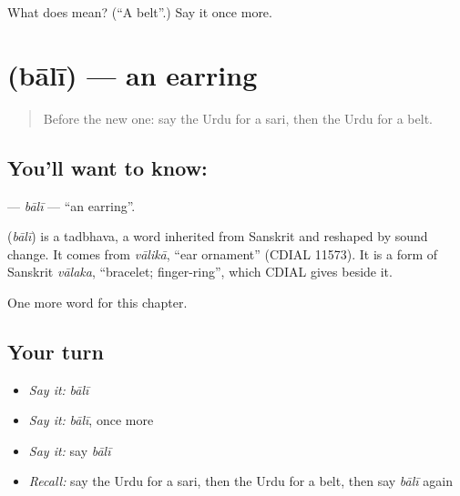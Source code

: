 \begin{tcolorbox}[breakable,colback=teal!4,colframe=teal!35!black,title={Before you move on}]
What does  mean? (\textquotedblleft{}A belt\textquotedblright{}.) Say it once more.
\end{tcolorbox}
\section[\texorpdfstring{\ur{بالی} (bālī)}{بالی (bālī)}]{ (bālī) — an earring}

\label{lesson:UR-C166-bali}



\begin{quote}
Before the new one: say the Urdu for a sari, then the Urdu for a belt.
\end{quote}

\subsection*{You'll want to know: }
\textbf{} — \emph{bālī} — \textquotedblleft{}an earring\textquotedblright{}.

\begin{cousinweb}
\textbf{} (\emph{bālī}) is a tadbhava, a word inherited from Sanskrit and reshaped by sound change. It comes from \emph{vālikā}, \textquotedblleft{}ear ornament\textquotedblright{} (CDIAL 11573). It is a form of Sanskrit \emph{vālaka}, \textquotedblleft{}bracelet; finger-ring\textquotedblright{}, which CDIAL gives beside it.
\end{cousinweb}

\begin{grammarlens}[title={What you've built}]
One more word for this chapter.
\end{grammarlens}

\subsection*{Your turn}
\begin{itemize}
\raggedright
  \item \emph{Say it:} \emph{bālī}
  \item \emph{Say it:} \emph{bālī}, once more
  \item \emph{Say it:} say \emph{bālī}
  \item \emph{Recall:} say the Urdu for a sari, then the Urdu for a belt, then say \emph{bālī} again
\end{itemize}

